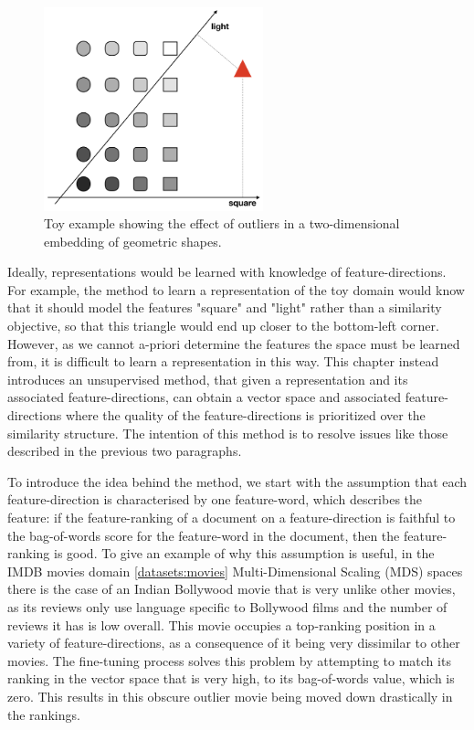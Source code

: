 \begin{figure}
	\centering
	\includegraphics[width=180pt]{images/shapes}
	\caption{Toy example showing the effect of outliers in a two-dimensional embedding of geometric shapes.}
	\label{fig:toyExample}
\end{figure}

Ideally, representations would be learned with knowledge of feature-directions. For example, the method to learn a representation of the toy domain would know that it should model the features "square" and "light" rather than a similarity objective, so that this triangle would end up closer to the bottom-left corner. However, as we cannot a-priori determine the features the space must be learned from, it is difficult to learn a representation in this way. This chapter instead introduces an unsupervised method, that given a representation and its associated feature-directions,  can obtain a  vector space and associated feature-directions where the quality of the feature-directions is prioritized  over the similarity structure. The intention of this method is to resolve issues like those described in the previous two paragraphs.

To introduce the idea behind the method, we start with the assumption that each feature-direction is characterised by one feature-word, which describes the feature: if the feature-ranking of a document on a feature-direction is faithful to the bag-of-words score for the feature-word in the document, then the feature-ranking is good. To give an example of why this assumption is useful, in the IMDB movies domain \ref{datasets:movies} Multi-Dimensional Scaling (MDS) spaces there is the case of an Indian Bollywood movie that is very unlike other movies, as its reviews only use language specific to Bollywood films and the number of reviews it has is low overall. This movie occupies a top-ranking position in a variety of feature-directions,  as a consequence of it being very dissimilar to other movies. The fine-tuning process solves this problem by attempting to match its  ranking in the vector space that is very high, to its bag-of-words value, which is zero. This results in this obscure outlier movie being moved down drastically in the rankings. 

